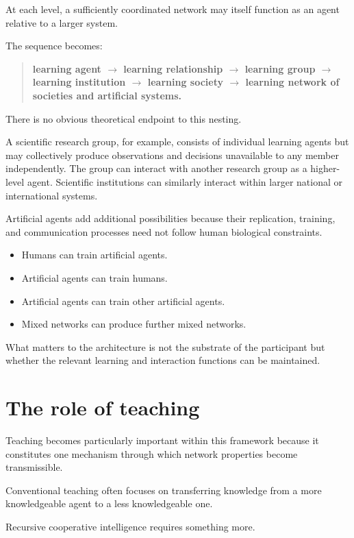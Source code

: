 \documentclass[11pt, a4paper]{article}
\begin{document}
At each level, a sufficiently coordinated network may itself function as an agent relative to a larger system.

The sequence becomes:

\begin{quote}
    \textbf{learning agent $\rightarrow$ learning relationship $\rightarrow$ learning group $\rightarrow$ learning institution $\rightarrow$ learning society $\rightarrow$ learning network of societies and artificial systems.}
\end{quote}

There is no obvious theoretical endpoint to this nesting.

A scientific research group, for example, consists of individual learning agents but may collectively produce observations and decisions unavailable to any member independently. The group can interact with another research group as a higher-level agent. Scientific institutions can similarly interact within larger national or international systems.

Artificial agents add additional possibilities because their replication, training, and communication processes need not follow human biological constraints.

\begin{itemize}[leftmargin=*]
    \item Humans can train artificial agents.
    \item Artificial agents can train humans.
    \item Artificial agents can train other artificial agents.
    \item Mixed networks can produce further mixed networks.
\end{itemize}

What matters to the architecture is not the substrate of the participant but whether the relevant learning and interaction functions can be maintained.

\section{The role of teaching}
Teaching becomes particularly important within this framework because it constitutes one mechanism through which network properties become transmissible.

Conventional teaching often focuses on transferring knowledge from a more knowledgeable agent to a less knowledgeable one.

Recursive cooperative intelligence requires something more.
\end{document}
